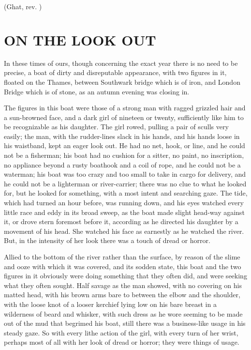 \documentclass[12pt]{article}
\begin{document}
(Ghat, rev. \rev)

\newpage


\section{ON THE LOOK OUT}

In these times of ours, though concerning the exact year there is no
need to be precise, a boat of dirty and disreputable appearance,
with two figures in it, floated on the Thames, between Southwark
bridge which is of iron, and London Bridge which is of stone, as an
autumn evening was closing in.

The figures in this boat were those of a strong man with ragged
grizzled hair and a sun-browned face, and a dark girl of nineteen or
twenty, sufficiently like him to be recognizable as his daughter.
The girl rowed, pulling a pair of sculls very easily; the man, with
the rudder-lines slack in his hands, and his hands loose in his
waistband, kept an eager look out. He had no net, hook, or line,
and he could not be a fisherman; his boat had no cushion for a
sitter, no paint, no inscription, no appliance beyond a rusty
boathook and a coil of rope, and he could not be a waterman; his
boat was too crazy and too small to take in cargo for delivery, and
he could not be a lighterman or river-carrier; there was no clue to
what he looked for, but he looked for something, with a most intent
and searching gaze. The tide, which had turned an hour before,
was running down, and his eyes watched every little race and eddy
in its broad sweep, as the boat made slight head-way against it, or
drove stern foremost before it, according as he directed his
daughter by a movement of his head. She watched his face as
earnestly as he watched the river. But, in the intensity of her look
there was a touch of dread or horror.

Allied to the bottom of the river rather than the surface, by reason
of the slime and ooze with which it was covered, and its sodden
state, this boat and the two figures in it obviously were doing
something that they often did, and were seeking what they often
sought. Half savage as the man showed, with no covering on his
matted head, with his brown arms bare to between the elbow and
the shoulder, with the loose knot of a looser kerchief lying low on
his bare breast in a wilderness of beard and whisker, with such
dress as he wore seeming to be made out of the mud that begrimed
his boat, still there was a business-like usage in his steady gaze.
So with every lithe action of the girl, with every turn of her wrist,
perhaps most of all with her look of dread or horror; they were
things of usage.
\end{document}
